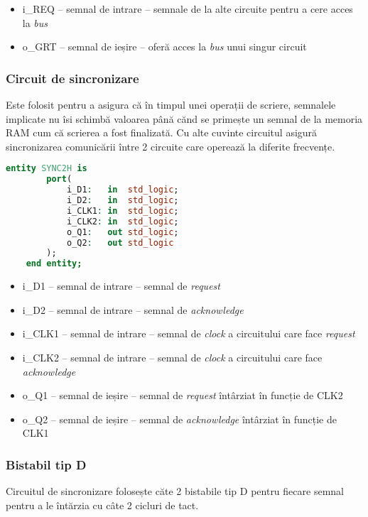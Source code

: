 \documentclass[../main.tex]{subfiles}
\begin{document}
\begin{itemize}
    \item i\_REQ -- semnal de intrare -- semnale de la alte circuite pentru a cere acces la \emph{bus}
    \item o\_GRT -- semnal de ieșire -- oferă acces la \emph{bus} unui singur circuit
\end{itemize}

\subsubsection{Circuit de sincronizare}
Este folosit pentru a asigura că în timpul unei operații de scriere, semnalele implicate nu îsi schimbă valoarea până cănd
se primește un semnal de la memoria RAM cum că scrierea a fost finalizată. Cu alte cuvinte circuitul asigură sincronizarea
comunicării între 2 circuite care operează la diferite frecvențe.

\begin{lstlisting}[language=VHDL, caption={Entitatea circuitului de sincronizare}, label={lst:sync}]
    entity SYNC2H is
        port(
            i_D1:   in  std_logic;
            i_D2:   in  std_logic;
            i_CLK1: in  std_logic;
            i_CLK2: in  std_logic;
            o_Q1:   out std_logic;
            o_Q2:   out std_logic
        );
    end entity;
\end{lstlisting}

\begin{itemize}
    \item i\_D1 -- semnal de intrare -- semnal de \emph{request}
    \item i\_D2 -- semnal de intrare -- semnal de \emph{acknowledge}
    \item i\_CLK1 -- semnal de intrare -- semnal de \emph{clock} a circuitului care face \emph{request}
    \item i\_CLK2 -- semnal de intrare -- semnal de \emph{clock} a circuitului care face \emph{acknowledge}
    \item o\_Q1 -- semnal de ieșire -- semnal de \emph{request} întârziat în funcție de CLK2
    \item o\_Q2 -- semnal de ieșire -- semnal de \emph{acknowledge} întârziat în funcție de CLK1
\end{itemize}

\subsubsection{Bistabil tip D}
Circuitul de sincronizare folosește căte 2 bistabile tip D pentru fiecare semnal pentru a le întărzia cu câte 2
cicluri de tact.
\end{document}
